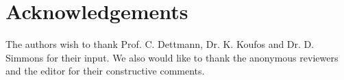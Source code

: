 \documentclass[10pt]{IEEEtran}
\begin{document}
\section*{Acknowledgements}
The authors wish to thank Prof. C. Dettmann, Dr. K. Koufos and Dr. D. Simmons for their input. We also would like to thank the anonymous reviewers and the editor for their constructive comments.





%
\end{document}
